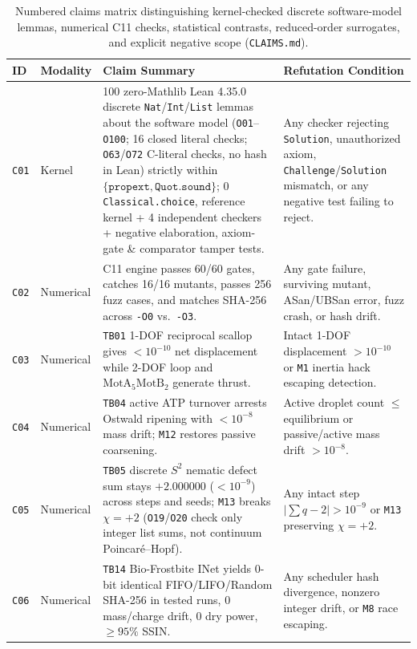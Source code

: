 \documentclass[11pt,reqno]{amsart}
\begin{document}
\begin{table}[t]
\centering
\caption{Numbered claims matrix distinguishing kernel-checked discrete software-model lemmas, numerical C11 checks, statistical contrasts, reduced-order surrogates, and explicit negative scope (\texttt{CLAIMS.md}).}
\label{tab:claims}
\footnotesize
\begin{tabularx}{\textwidth}{@{}l l L L@{}}
\toprule
\textbf{ID} & \textbf{Modality} & \textbf{Claim Summary} & \textbf{Refutation Condition} \\
\midrule
\texttt{C01} & Kernel & 100 zero-Mathlib Lean 4.35.0 discrete \texttt{Nat}/\texttt{Int}/\texttt{List} lemmas about the software model (\texttt{O01}--\texttt{O100}; 16 closed literal checks; \texttt{O63}/\texttt{O72} C-literal checks, no hash in Lean) strictly within $\{\texttt{propext}, \texttt{Quot.sound}\}$; 0 \texttt{Classical.choice}, reference kernel + 4 independent checkers + negative elaboration, axiom-gate \& comparator tamper tests. & Any checker rejecting \texttt{Solution}, unauthorized axiom, \texttt{Challenge}/\texttt{Solution} mismatch, or any negative test failing to reject. \\
\texttt{C02} & Numerical & C11 engine passes 60/60 gates, catches 16/16 mutants, passes 256 fuzz cases, and matches SHA-256 across \texttt{-O0} vs.\ \texttt{-O3}. & Any gate failure, surviving mutant, ASan/UBSan error, fuzz crash, or hash drift. \\
\texttt{C03} & Numerical & \texttt{TB01} 1-DOF reciprocal scallop gives $<10^{-10}$ net displacement while 2-DOF loop and $\mathrm{MotA}_5\mathrm{MotB}_2$ generate thrust. & Intact 1-DOF displacement $>10^{-10}$ or \texttt{M1} inertia hack escaping detection. \\
\texttt{C04} & Numerical & \texttt{TB04} active ATP turnover arrests Ostwald ripening with $<10^{-8}$ mass drift; \texttt{M12} restores passive coarsening. & Active droplet count $\le$ equilibrium or passive/active mass drift $>10^{-8}$. \\
\texttt{C05} & Numerical & \texttt{TB05} discrete $S^2$ nematic defect sum stays $+2.000000$ ($<10^{-9}$) across steps and seeds; \texttt{M13} breaks $\chi = +2$ (\texttt{O19}/\texttt{O20} check only integer list sums, not continuum Poincar\'e--Hopf). & Any intact step $|\sum q - 2| > 10^{-9}$ or \texttt{M13} preserving $\chi = +2$. \\
\texttt{C06} & Numerical & \texttt{TB14} Bio-Frostbite INet yields 0-bit identical FIFO/LIFO/Random SHA-256 in tested runs, 0 mass/charge drift, 0 dry power, $\ge 95\%$ SSIN. & Any scheduler hash divergence, nonzero integer drift, or \texttt{M8} race escaping. \\

\end{tabularx}
\end{table}
\end{document}
